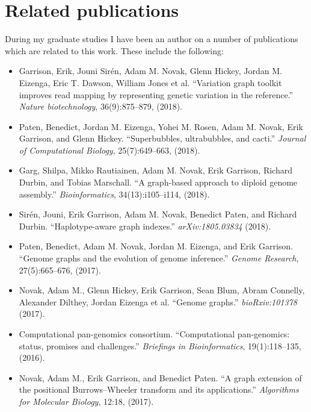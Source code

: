 \chapter{Related publications}

During my graduate studies I have been an author on a number of publications which are related to this work.
These include the following:

\begin{itemize}[noitemsep]

\item Garrison, Erik, Jouni Sirén, Adam M. Novak, Glenn Hickey, Jordan M. Eizenga, Eric T. Dawson, William Jones et al. ``Variation graph toolkit improves read mapping by representing genetic variation in the reference.'' \emph{Nature biotechnology}, 36(9):875--879, (2018).

\item Paten, Benedict, Jordan M. Eizenga, Yohei M. Rosen, Adam M. Novak, Erik Garrison, and Glenn Hickey. ``Superbubbles, ultrabubbles, and cacti.'' \emph{Journal of Computational Biology}, 25(7):649--663, (2018).

\item Garg, Shilpa, Mikko Rautiainen, Adam M. Novak, Erik Garrison, Richard Durbin, and Tobias Marschall. ``A graph-based approach to diploid genome assembly.'' \emph{Bioinformatics}, 34(13):i105--i114, (2018).

\item Sirén, Jouni, Erik Garrison, Adam M. Novak, Benedict Paten, and Richard Durbin. ``Haplotype-aware graph indexes.'' \emph{arXiv:1805.03834} (2018).

\item Paten, Benedict, Adam M. Novak, Jordan M. Eizenga, and Erik Garrison. ``Genome graphs and the evolution of genome inference.'' \emph{Genome Research}, 27(5):665--676, (2017).

\item Novak, Adam M., Glenn Hickey, Erik Garrison, Sean Blum, Abram Connelly, Alexander Dilthey, Jordan Eizenga et al. ``Genome graphs.'' \emph{bioRxiv:101378} (2017).

\item Computational pan-genomics consortium. ``Computational pan-genomics: status, promises and challenges.'' \emph{Briefings in Bioinformatics}, 19(1):118--135, (2016).

\item Novak, Adam M., Erik Garrison, and Benedict Paten. ``A graph extension of the positional Burrows–Wheeler transform and its applications.'' \emph{Algorithms for Molecular Biology}, 12:18, (2017).

\end{itemize}
